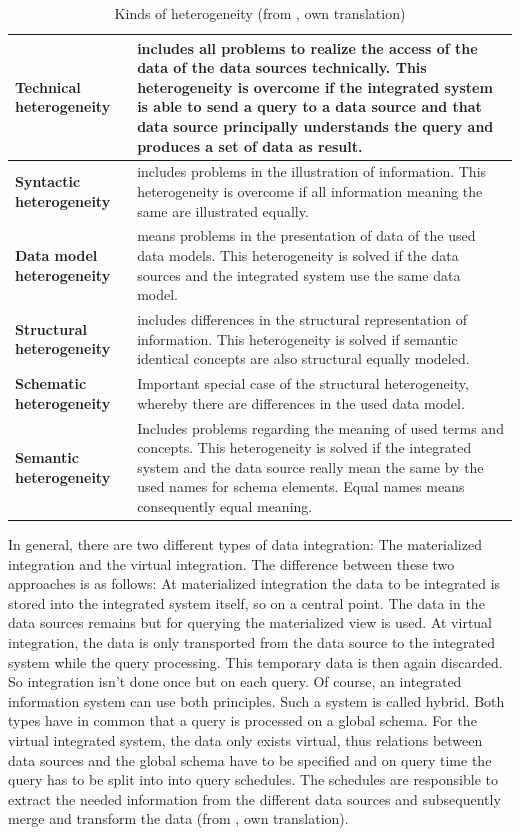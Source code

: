 \begin{table}[]
\centering
\begin{tabular}{|l|p{}|}
\hline
 \textbf{Technical  heterogeneity}  &  includes all problems to realize the access of the data of the data sources technically. This heterogeneity is overcome if the integrated system is able to send a query to a data source and that data source principally understands the query and produces a set of data as result.\\ \hline
 \textbf{Syntactic  heterogeneity}    &  includes problems in the illustration of information. This heterogeneity is overcome if all information meaning the same are illustrated equally.\\ \hline
 \textbf{Data model  heterogeneity} &  means problems in the presentation of data of the used data models. This heterogeneity is solved if the data sources and the integrated system use the same data model.\\ \hline
 \textbf{Structural  heterogeneity}    &  includes differences in the structural representation of information. This heterogeneity is solved if semantic identical concepts are also structural equally modeled. \\ \hline
 \textbf{Schematic  heterogeneity} &  Important special case of the structural heterogeneity, whereby there are differences in the used data model.\\ \hline
 \textbf{Semantic  heterogeneity}    &  Includes problems regarding the meaning of used terms and concepts. This heterogeneity is solved if the integrated system and the data source really mean the same by the used names for schema elements. Equal names means consequently equal meaning.\\ \hline
\end{tabular}
\caption{Kinds of heterogeneity (from \cite[p. 60/61]{DBLP:books/dp/LeserN2006}, own translation)}
\label{kinds-of-heterogeneity}
\end{table}

In general, there are two different types of data integration: The materialized integration and the virtual integration. The difference between these two approaches is as follows: At materialized integration the data to be integrated is stored  into the integrated system itself, so on a central point. The data in the data sources remains but for querying the materialized view is used. At virtual integration, the data is only transported from the data source to the integrated system while the query processing. This temporary data is then again discarded. So integration isn't done once but on each query. Of course, an integrated information system can use both principles. Such a system is called hybrid. Both types have in common that a query is processed on a global schema. For the virtual integrated system, the data only exists virtual, thus relations between data sources and the global schema have to be specified and on query time the query has to be split into into query schedules. The schedules are responsible to extract the needed information from the different data sources and subsequently merge and transform the data (from \cite[p. 86-88]{DBLP:books/dp/LeserN2006}, own translation).

